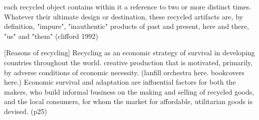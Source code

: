  each recycled object contains within it a reference to two or more distinct times.  Whatever their ultimate design or destination, these recycled artifacts are, by definition, "impure", "inauthentic" products of past and present, here and there, "us" and "them" (clifford 1992) 

[Reasons of recycling]  Recycling as an economic strategy of survival in developing countries throughout the world. creative production that is motivated, primarily, by adverse conditions of economic necessity. (lanfill orchestra here. bookcovers here.) Economic survival and adaptation are influential factors for both the makers, who build informal business on the making and selling of recycled goods, and the local consumers, for whom the market for affordable, utilitarian goods is devised. (p25)

